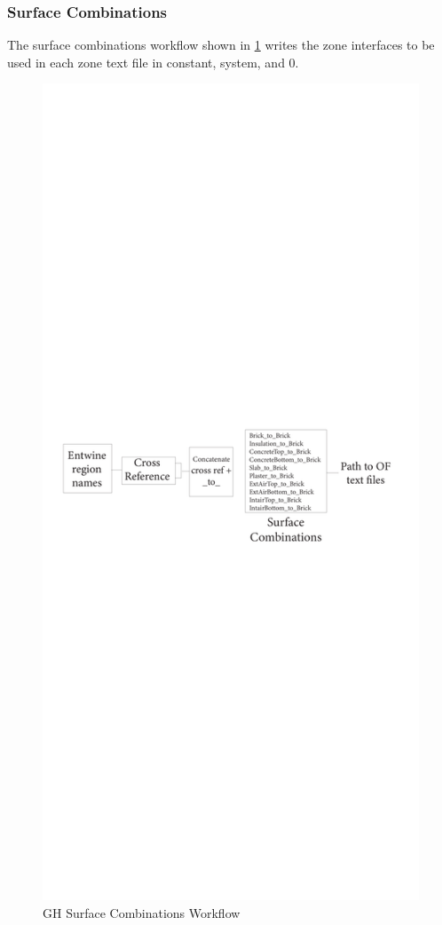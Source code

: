 \subsubsection{Surface Combinations}
The surface combinations workflow shown in \ref{surfgh} writes the zone interfaces to be used in each zone text file in constant, system, and 0. 

\begin{figure}[tbh]
\centering
\includegraphics[trim=0cm 39cm 0cm 29cm, clip, width=0.8\linewidth]{Figures/surfcombgh.pdf}
\hspace{0.7cm}
\caption{\gls{GH} Surface Combinations Workflow}
\label{surfgh}
\end{figure}




